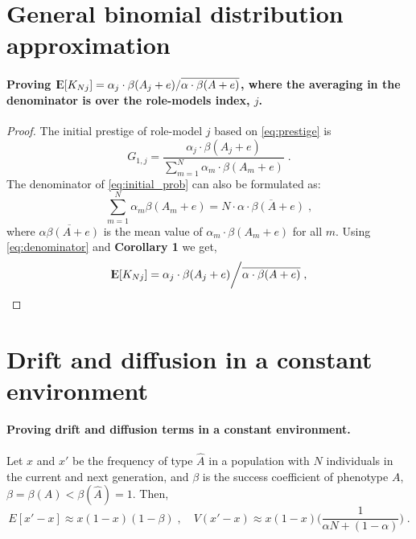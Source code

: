 \documentclass[12pt]{extarticle}
\DeclareMathOperator*{\E}{{\rm I\kern-.3em E}}
\begin{document}
\begin{appendices}
\renewcommand{\theequation}{\thesection\arabic{equation}}

\section{General binomial distribution approximation} \label{sec:GBD}

\paragraph{Proving $\E[K_{Nj}] = \alpha_j \cdot \beta(A_j+e) / \overline{\alpha \cdot \beta(A+e)}$, where the averaging in the denominator is over the role-models index, $j$.}


\begin{proof}
The initial prestige of role-model $j$ based on \cref{eq:prestige} is
\begin{equation}\label{eq:initial_prob}
G_{1,j} = \frac{\alpha_j\cdot\beta(A_j+e)}{\sum\limits_{m=1}^{N} \alpha_m\cdot\beta(A_m+e)} \;.
\end{equation}
The denominator of \cref{eq:initial_prob} can also be formulated as:
\begin{equation}\label{eq:denominator}
 \sum\limits_{m=1}^{N}\alpha_m\beta(A_m+e) = N \cdot \overline{\alpha \cdot \beta(A+e)} \;,
\end{equation}
where $\overline{\alpha\beta(A+e)}$ is the mean value of $\alpha_m\cdot\beta(A_m+e)$ for all $m$.
Using \cref{eq:denominator} and \textbf{Corollary 1} we get,
\begin{equation}
\E[K_{Nj}] = \alpha_j \cdot \beta(A_j+e) \bigg/ \overline{\alpha \cdot \beta(A+e)} \;,
\end{equation}
\end{proof}

\section{Drift and diffusion in a constant environment} \label{sec:drift_diff_const}

\paragraph{Proving drift and diffusion terms in a constant environment.}
Let $x$ and $x'$ be the frequency of type $\hat{A}$ in a population with $N$ individuals in the current and next generation, and  $\beta$ is the success coefficient of phenotype $A$, $\beta = \beta(A) < \beta(\hat{A}) = 1$.
Then,
\begin{equation*}
E[x'-x] \approx x(1-x)(1-\beta) \;, 
\quad
V(x'-x) \approx x(1-x)\Big(\frac{1}{\alpha N + (1-\alpha)}\Big) \;.
\end{equation*} 



\end{appendices}
\end{document}
